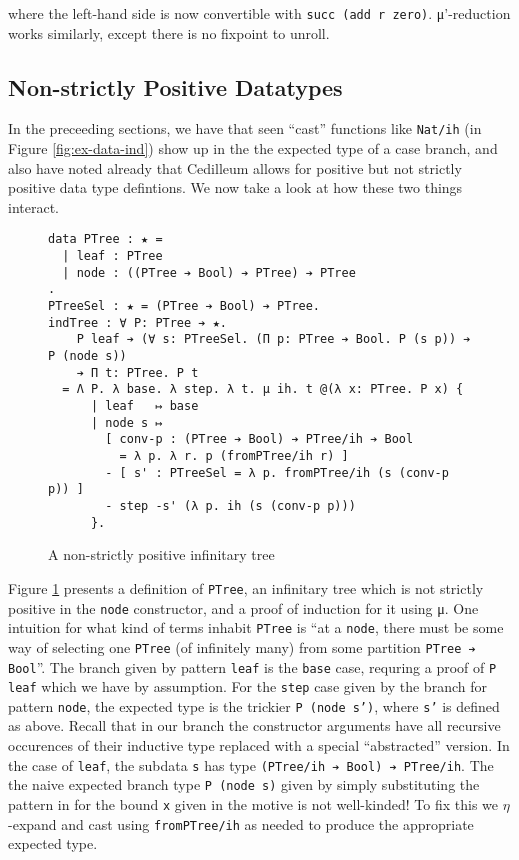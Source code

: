 \documentclass{article}
\begin{document}
\noindent where the left-hand side is now convertible with \texttt{succ (add r
  zero)}. μ'-reduction works similarly, except there is no fixpoint to unroll.

\subsection{Non-strictly Positive Datatypes}
\label{sec:positive-data}
In the preceeding sections, we have that seen ``cast'' functions like
\texttt{Nat/ih} (in Figure \ref{fig:ex-data-ind}) show up in the the expected
type of a case branch, and also have noted already that Cedilleum allows for
positive but not strictly positive data type defintions. We now take a look at
how these two things interact.

\begin{figure}[h]
\begin{verbatim}
data PTree : ★ =
  | leaf : PTree
  | node : ((PTree ➔ Bool) ➔ PTree) ➔ PTree
.
PTreeSel : ★ = (PTree ➔ Bool) ➔ PTree.
indTree : ∀ P: PTree ➔ ★.
    P leaf ➔ (∀ s: PTreeSel. (Π p: PTree ➔ Bool. P (s p)) ➔ P (node s))
    ➔ Π t: PTree. P t
  = Λ P. λ base. λ step. λ t. μ ih. t @(λ x: PTree. P x) {
      | leaf   ↦ base
      | node s ↦
        [ conv-p : (PTree ➔ Bool) ➔ PTree/ih ➔ Bool
          = λ p. λ r. p (fromPTree/ih r) ]
        - [ s' : PTreeSel = λ p. fromPTree/ih (s (conv-p p)) ]
        - step -s' (λ p. ih (s (conv-p p)))
      }.
\end{verbatim}
  \caption{A non-strictly positive infinitary tree}
  \label{fig:ptree}
\end{figure}

Figure \ref{fig:ptree} presents a definition of \texttt{PTree}, an infinitary
tree which is not strictly positive in the \texttt{node} constructor, and a
proof of induction for it using μ. One intuition for what kind of terms inhabit
\texttt{PTree} is ``at a \texttt{node}, there must be some way of selecting one
\texttt{PTree} (of infinitely many) from some partition \texttt{PTree ➔ Bool}''.
The branch given by pattern \texttt{leaf} is the \texttt{base} case, requring a
proof of \texttt{P leaf} which we have by assumption. For the \texttt{step} case
given by the branch for pattern \texttt{node}, the expected type is the trickier
\texttt{P (node s')}, where \texttt{s'} is defined as above. Recall that in our
branch the constructor arguments have all recursive occurences of their
inductive type replaced with a special ``abstracted'' version. In the case of
\texttt{leaf}, the subdata \texttt{s} has type \texttt{(PTree/ih ➔ Bool) ➔
PTree/ih}. The the naive expected branch type \texttt{P (node s)} given by
simply substituting the pattern in for the bound \texttt{x} given in the motive
is not well-kinded! To fix this we $\eta$-expand and cast using \texttt{fromPTree/ih}
as needed to produce the appropriate expected type.
\end{document}

